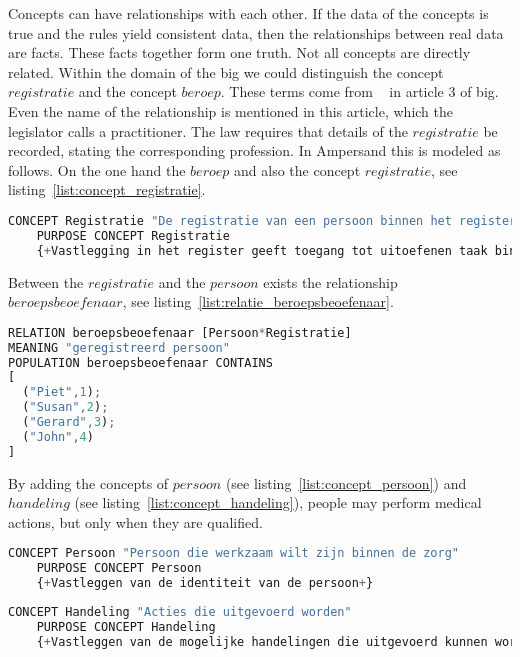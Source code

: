 Concepts can have relationships with each other.
If the data of the concepts is true and the rules yield consistent data, then the relationships between real data are facts.
These facts together form one truth.
Not all concepts are directly related.
Within the domain of the \acrshort{big} we could distinguish the concept $registratie$ and the concept $beroep$.
These terms come from ~ in article 3 of \acrshort{big}.
Even the name of the relationship is mentioned in this article, which the legislator calls a practitioner.
The law requires that details of the $registratie$ be recorded, stating the corresponding profession.
In Ampersand this is modeled as follows.
On the one hand the $beroep$ and also the concept $registratie$, see listing~\ref{list:concept_registratie}.
\begin{lstlisting}[language=Octave, caption={Listing Concept Registratie },captionpos=b, label={list:concept_registratie}] 
    CONCEPT Registratie "De registratie van een persoon binnen het register" 
    PURPOSE CONCEPT Registratie 
    {+Vastlegging in het register geeft toegang tot uitoefenen taak binnen de gezondheidszorg+}
\end{lstlisting}
Between the $registratie$ and the $persoon$ exists the relationship $beroepsbeoefenaar$, see listing~\ref{list:relatie_beroepsbeoefenaar}.
\begin{lstlisting}[language=Octave, caption={Listing RELATION "beroepsbeoefenaar" },captionpos=b, label={list:relatie_beroepsbeoefenaar}] 
RELATION beroepsbeoefenaar [Persoon*Registratie] 
MEANING "geregistreerd persoon"
POPULATION beroepsbeoefenaar CONTAINS 
[
  ("Piet",1);
  ("Susan",2);
  ("Gerard",3);
  ("John",4)
]\end{lstlisting}
By adding the concepts of $persoon$ (see listing~\ref{list:concept_persoon}) and $handeling$ (see listing~\ref{list:concept_handeling}), people may perform  medical actions, but only when they are qualified.
\begin{lstlisting}[language=Octave, caption={Listing Concept Persoon },captionpos=b, label={list:concept_persoon}] 
    CONCEPT Persoon "Persoon die werkzaam wilt zijn binnen de zorg"
    PURPOSE CONCEPT Persoon 
    {+Vastleggen van de identiteit van de persoon+}
\end{lstlisting}
\begin{lstlisting}[language=Octave, caption={Listing Concept Handeling },captionpos=b, label={list:concept_handeling}] 
    CONCEPT Handeling "Acties die uitgevoerd worden" 
    PURPOSE CONCEPT Handeling 
    {+Vastleggen van de mogelijke handelingen die uitgevoerd kunnen worden binnen de zorg+}
\end{lstlisting}

